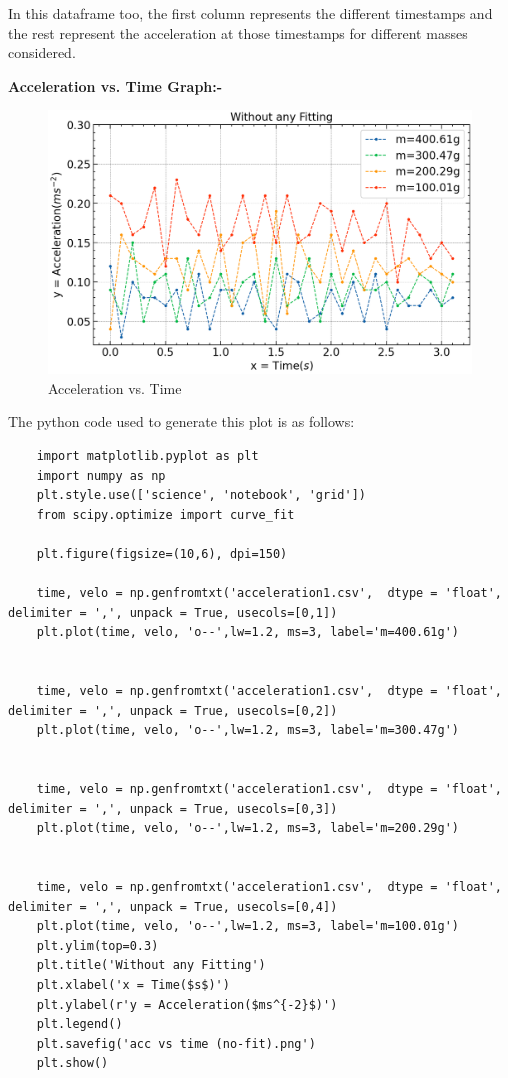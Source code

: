 \documentclass{article}
\begin{document}
In this dataframe too, the first column represents the different timestamps and the rest represent the acceleration at those timestamps for different masses considered.

\pagebreak

\textbf{Acceleration vs. Time Graph:-}

\begin{figure}[H]
	\centering
	\includegraphics[scale=0.7]{acc vs time (no-fit).png}
	\caption{Acceleration vs. Time}
	\label{figure:accl2}%
\end{figure}

The python code used to generate this plot is as follows:

\begin{lstlisting}
	import matplotlib.pyplot as plt
	import numpy as np
	plt.style.use(['science', 'notebook', 'grid'])
	from scipy.optimize import curve_fit
	
	plt.figure(figsize=(10,6), dpi=150)
	
	time, velo = np.genfromtxt('acceleration1.csv',  dtype = 'float', delimiter = ',', unpack = True, usecols=[0,1])
	plt.plot(time, velo, 'o--',lw=1.2, ms=3, label='m=400.61g')
	
	
	time, velo = np.genfromtxt('acceleration1.csv',  dtype = 'float', delimiter = ',', unpack = True, usecols=[0,2])
	plt.plot(time, velo, 'o--',lw=1.2, ms=3, label='m=300.47g')
	
	
	time, velo = np.genfromtxt('acceleration1.csv',  dtype = 'float', delimiter = ',', unpack = True, usecols=[0,3])
	plt.plot(time, velo, 'o--',lw=1.2, ms=3, label='m=200.29g')
	
	
	time, velo = np.genfromtxt('acceleration1.csv',  dtype = 'float', delimiter = ',', unpack = True, usecols=[0,4])
	plt.plot(time, velo, 'o--',lw=1.2, ms=3, label='m=100.01g')
	plt.ylim(top=0.3)
	plt.title('Without any Fitting')
	plt.xlabel('x = Time($s$)')
	plt.ylabel(r'y = Acceleration($ms^{-2}$)')
	plt.legend()
	plt.savefig('acc vs time (no-fit).png')
	plt.show()
\end{lstlisting}
\end{document}
